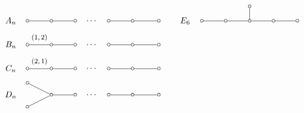 \documentclass[12pt]{amsart}
\numberwithin{equation}{subsection}
\theoremstyle{plain}
\theoremstyle{definition}
\begin{document}
\[\begin{tikzpicture}[scale=1,inner sep=-.3,outer sep=-.3]
\node (a) at (-.7,0) {$A_n$};
\node (a1) at (0,0) {$\circ$};
\node (a2) at (1,0) {$\circ$};
\node (a3) at (2,0) {$\circ$};
\node (a4) at (2.7,0) {$\cdots$};
\node (a5) at (3.4,0) {$\circ$};
\node (a6) at (4.4,0) {$\circ$};
\node (a7) at (5.5,0) {$\circ$};
\draw[-] (a1) -- (a2) ;
\draw[-] (a2) -- (a3) ;
\draw[-] (a5) -- (a6) ;
\draw[-] (a6) -- (a7) ;
\node (b) at (-.7,-1.) {$B_n$};
\node (b1) at (0,-1.) {$\circ$};
\node (b2) at (1,-1.) {$\circ$};
\node (b3) at (2,-1.) {$\circ$};
\node (b4) at (2.7,-1.) {$\cdots$};
\node (b5) at (3.4,-1.) {$\circ$};
\node (b6) at (4.4,-1.) {$\circ$};
\node (b7) at (5.5,-1.) {$\circ$};
\node at (.5,-.7) {\footnotesize $(1,2)$};
\draw[-] (b1) -- (b2) ;
\draw[-] (b2) -- (b3) ;
\draw[-] (b5) -- (b6) ;
\draw[-] (b6) -- (b7) ;
\node (c) at (-.7,-2.) {$C_n$};
\node (c1) at (0,-2.) {$\circ$};
\node (c2) at (1,-2.) {$\circ$};
\node (c3) at (2,-2.) {$\circ$};
\node (c4) at (2.7,-2.) {$\cdots$};
\node (c5) at (3.4,-2.) {$\circ$};
\node (c6) at (4.4,-2.) {$\circ$};
\node (c7) at (5.5,-2.) {$\circ$};
\node at (.5,-1.7) {\footnotesize $(2,1)$};
\draw[-] (c1) -- (c2) ;
\draw[-] (c2) -- (c3) ;
\draw[-] (c5) -- (c6) ;
\draw[-] (c6) -- (c7) ;
\node (d) at (-.7,-3.1) {$D_n$};
\node (d0) at (0,-2.6) {$\circ$};
\node (d1) at (0,-3.6) {$\circ$};
\node (d2) at (1,-3.1) {$\circ$};
\node (d3) at (2,-3.1) {$\circ$};
\node (d4) at (2.7,-3.1) {$\cdots$};
\node (d5) at (3.4,-3.1) {$\circ$};
\node (d6) at (4.4,-3.1) {$\circ$};
\node (d7) at (5.5,-3.1) {$\circ$};
\draw[-] (d0) -- (d2) ;
\draw[-] (d1) -- (d2) ;
\draw[-] (d2) -- (d3) ;
\draw[-] (d5) -- (d6) ;
\draw[-] (d6) -- (d7) ;
\node (e6) at (6.6,-0) {$E_6$};
\node (e60) at (9.3,.6) {$\circ$};
\node (e61) at (7.3,-0) {$\circ$};
\node (e62) at (8.3,-0) {$\circ$};
\node (e63) at (9.3,-0) {$\circ$};
\node (e65) at (10.3,-0) {$\circ$};
\node (e66) at (11.3,-0) {$\circ$};
\draw[-] (e60) -- (e63) ;
\draw[-] (e61) -- (e62) ;
\draw[-] (e62) -- (e63) ;
\draw[-] (e63) -- (e65) ;
\draw[-] (e65) -- (e66) ;

\end{tikzpicture}\]
\end{document}
